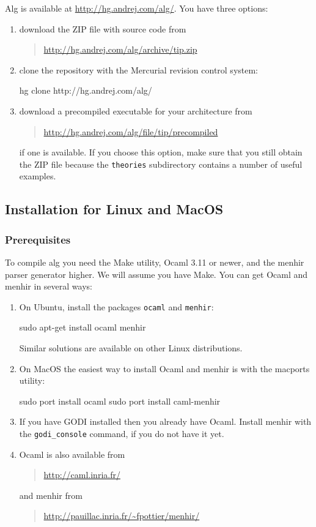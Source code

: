 \documentclass{article}
\begin{document}
Alg is available at \url{http://hg.andrej.com/alg/}. You have three
options:
%
\begin{enumerate}
\item download the ZIP file with source code from
  \begin{quote}
    \url{http://hg.andrej.com/alg/archive/tip.zip}
  \end{quote}
\item clone the repository with the Mercurial revision control system:
%
\begin{shell}
hg clone http://hg.andrej.com/alg/
\end{shell}
\item download a precompiled executable for your architecture from
  \begin{quote}
    \url{http://hg.andrej.com/alg/file/tip/precompiled}
  \end{quote}
  if one is available. If you choose this option, make sure that you
  still obtain the ZIP file because the \texttt{theories} subdirectory
  contains a number of useful examples.
\end{enumerate}

\subsection{Installation for Linux and MacOS}
\label{sec:comp-under-linux}

\subsubsection{Prerequisites}

To compile alg you need the Make utility, Ocaml 3.11 or newer, and the
menhir parser generator higher. We will assume you have Make. You can
get Ocaml and menhir in several ways:
%
\begin{enumerate}
\item On Ubuntu, install the packages \texttt{ocaml} and
  \texttt{menhir}:
\begin{shell}
sudo apt-get install ocaml menhir    
\end{shell}
  Similar solutions are available on other Linux distributions.
\item On MacOS the easiest way to install Ocaml and menhir is with
  the macports utility:
\begin{shell}
sudo port install ocaml
sudo port install caml-menhir
\end{shell}
\item If you have GODI installed then you already have Ocaml. Install
  menhir with the \texttt{godi\_console} command, if you do not have it yet.
\item Ocaml is also available from
  \begin{quote}
    \url{http://caml.inria.fr/}
  \end{quote}
  and menhir from
  \begin{quote}
    \url{http://pauillac.inria.fr/~fpottier/menhir/}
  \end{quote}
\end{enumerate}
\end{document}
